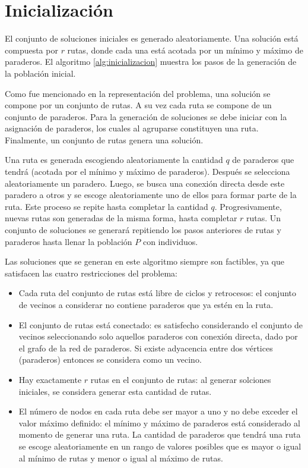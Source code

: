 \section{Inicialización}

El conjunto de soluciones iniciales es generado aleatoriamente. Una solución está compuesta por $r$ rutas, donde cada una está acotada por un mínimo y máximo de paraderos. El algoritmo \ref{alg:inicializacion} muestra los pasos de la generación de la población inicial.

Como fue mencionado en la representación del problema, una solución se compone por un conjunto de rutas. A su vez cada ruta se compone de un conjunto de paraderos. Para la generación de soluciones se debe iniciar con la asignación de paraderos, los cuales al agruparse constituyen una ruta. Finalmente, un conjunto de rutas genera una solución. 

Una ruta es generada escogiendo aleatoriamente la cantidad $q$ de paraderos que tendrá (acotada por el mínimo y máximo de paraderos). Después se selecciona aleatoriamente un paradero. Luego, se busca una conexión directa desde este paradero a otros y se escoge aleatoriamente uno de ellos para formar parte de la ruta. Este proceso se repite hasta completar la cantidad $q$. Progresivamente, nuevas rutas son generadas de la misma forma, hasta completar $r$ rutas. Un conjunto de soluciones se generará repitiendo los pasos anteriores de rutas y paraderos hasta llenar la población $P$ con \popsize{} individuos.

Las soluciones que se generan en este algoritmo siempre son factibles, ya que satisfacen las cuatro restricciones del problema:
\begin{itemize}
\item Cada ruta del conjunto de rutas está libre de ciclos y retrocesos: el conjunto de vecinos a considerar no contiene paraderos que ya estén en la ruta.
\item El conjunto de rutas está conectado: es satisfecho considerando el conjunto de vecinos seleccionando solo aquellos paraderos con conexión directa, dado por el grafo de la red de paraderos. Si existe adyacencia entre dos vértices (paraderos) entonces se considera como un vecino.
\item Hay exactamente $r$ rutas en el conjunto de rutas: al generar solciones iniciales, se considera generar esta cantidad de rutas.
\item El número de nodos en cada ruta debe ser mayor a uno y no debe exceder el valor máximo definido: el mínimo y máximo de paraderos está considerado al momento de generar una ruta. La cantidad de paraderos que tendrá una ruta se escoge aleatoriamente en un rango de valores posibles que es mayor o igual al mínimo de rutas y menor o igual al máximo de rutas.
\end{itemize} 

